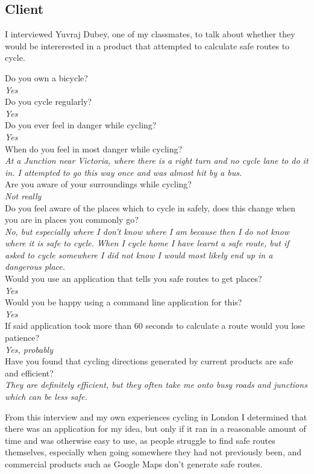 \documentclass[11pt,twoside,a4paper]{article}
\begin{document}
\subsection{Client}
I interviewed Yuvraj Dubey, one of my classmates, to talk about whether they would be intererested in a product that attempted to calculate safe routes to cycle. 
\begin{center}
    Do you own a bicycle?\\
    \textit{Yes}\\
    Do you cycle regularly?\\
    \textit{Yes}\\
    Do you ever feel in danger while cycling?\\
    \textit{Yes}\\
    When do you feel in most danger while cycling?\\
    \textit{At a Junction near Victoria, where there is a right turn and no cycle lane to do it in. I attempted to go this way once and was almost hit by a bus. }  \\
    Are you aware of your surroundings while cycling?\\
    \textit{Not really}\\
    Do you feel aware of the places which to cycle in safely, does this change when you are in places you commonly go? \\
    \textit{No, but especially where I don't know where I am because then I do not know where it is safe to cycle. When I cycle home I have learnt a safe route, but if asked to cycle somewhere I did not know I would most likely end up in a dangerous place.} \\
    Would you use an application that tells you safe routes to get places?\\
    \textit{Yes}\\
    Would you be happy using a command line application for this?\\
    \textit{Yes}\\
    If said application took more than 60 seconds to calculate a route would you lose patience?\\
    \textit{Yes, probably}\\
    Have you found that cycling directions generated by current products are safe and efficient?\\
    \textit{They are definitely efficient, but they often take me onto busy roads and junctions which can be less safe.}
\end{center}
From this interview and my own experiences cycling in London I determined that there was an application for my idea, but only if it ran in a reasonable amount of time and was otherwise easy to use, as people struggle to find safe routes themselves, especially when going somewhere they had not previously been, and commercial
products such as Google Maps don't generate safe routes. 
\newpage
\end{document}
